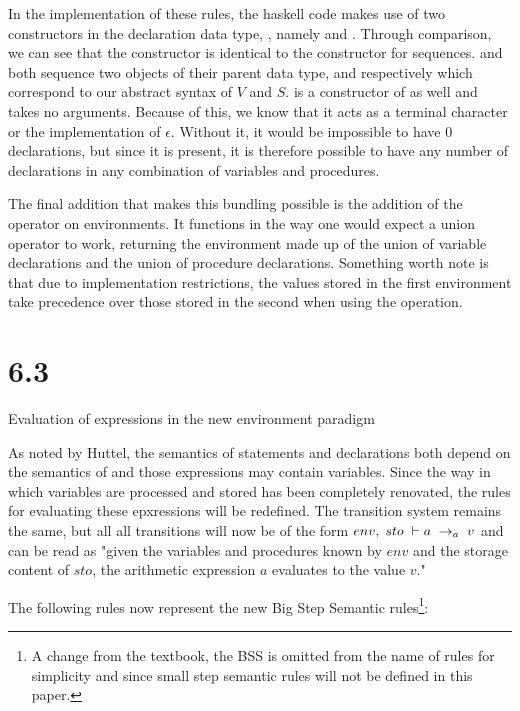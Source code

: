 In the implementation of these rules, the haskell code makes use of two constructors in the declaration data type, , namely  and . Through comparison, we can see that the constructor  is identical to the constructor  for sequences.  and  both sequence two objects of their parent data type,  and  respectively which correspond to our abstract syntax of $V$ and $S$.  is a constructor of  as well and takes no arguments. Because of this, we know that it acts as a terminal character or the implementation of $\epsilon$. Without it, it would be impossible to have 0 declarations, but since it is present, it is therefore possible to have any number of declarations in any combination of variables and procedures. \par

The final addition that makes this bundling possible is the addition of the  operator on environments. It functions in the way one would expect a union operator to work, returning the environment made up of the union of variable declarations and the union of procedure declarations. Something worth note is that due to implementation restrictions, the values stored in the first environment take precedence over those stored in the second when using the  operation.

\section{6.3}{Evaluation of expressions in the new environment paradigm}

As noted by Huttel, the semantics of statements and declarations both depend on the semantics of  and those expressions may contain variables. Since the way in which variables are processed and stored has been completely renovated, the rules for evaluating these epxressions will be redefined. The transition system remains the same, but all all transitions will now be of the form $env, \; sto \; \vdash a \; \to_a \; v$ and can be read as "given the variables and procedures known by $env$ and the storage content of $sto$, the arithmetic expression $a$ evaluates to the value $v$." \par

The following rules now represent the new Big Step Semantic rules\footnote{A change from the textbook, the BSS is omitted from the name of rules for simplicity and since small step semantic rules will not be defined in this paper.}:

